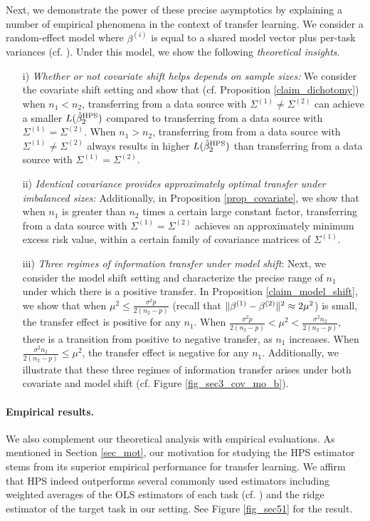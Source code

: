 Next, we demonstrate the power of these precise asymptotics by explaining a number of empirical phenomena in the context of transfer learning.
We consider a random-effect model where $\beta^{(i)}$ is equal to a shared model vector plus per-task variances (cf. \citet{dobriban2018high}).
Under this model, we show the following \textit{theoretical insights}.
\begin{enumerate}
    \item[i)] \textit{Whether or not covariate shift helps depends on sample sizes:} We consider the covariate shift setting and show that (cf. Proposition \ref{claim_dichotomy}) when $n_1 < n_2$, transferring from a data source with $\Sigma^{(1)} \neq \Sigma^{(2)}$ can achieve a smaller $L(\hat{\beta}_2^{\textup{HPS}})$ compared to transferring from a data source with $\Sigma^{(1)} = \Sigma^{(2)}$. When $n_1 > n_2$, transferring from from a data source with $\Sigma^{(1)} \neq \Sigma^{(2)}$ always results in higher $L(\hat{\beta}_2^{\textup{HPS}})$ than transferring from a data source with $\Sigma^{(1)} = \Sigma^{(2)}$.
    \item[ii)] \textit{Identical covariance provides approximately optimal transfer under imbalanced sizes:} Additionally, in Proposition \ref{prop_covariate}, we show that when $n_1$ is greater than $n_2$ times a certain large constant factor, transferring from a data source with $\Sigma^{(1)} = \Sigma^{(2)}$ achieves an approximately minimum excess risk value, within a certain family of covariance matrices of $\Sigma^{(1)}$.
    \item[iii)] \textit{Three regimes of information transfer under model shift}: Next, we consider the model shift setting and characterize the precise range of $n_1$ under which there is a positive transfer.
    In Proposition \ref{claim_model_shift}, we show that when $\mu^2 \le \frac{\sigma^2 p}{2(n_2 - p)}$ (recall that $\|\beta^{(1)} - \beta^{(2)}\|^2 \approx 2\mu^2$) is small, the transfer effect is positive for any $n_1$.
    When $\frac{\sigma^2 p}{2(n_2 - p)} < \mu^2 < \frac{\sigma^2 n_2}{2(n_2 - p)}$, there is a transition from positive to negative transfer, as $n_1$ increases.
    When $\frac{\sigma^2 n_2}{2(n_2 - p)} \le \mu^2$, the transfer effect is negative for any $n_1$.
    Additionally, we illustrate that these three regimes of information transfer arises under both covariate and model shift (cf. Figure \ref{fig_sec3_cov_mo_b}).
\end{enumerate}

\paragraph{Empirical results.}
We also complement our theoretical analysis with empirical evaluations.
As mentioned in Section \ref{sec_mot}, our motivation for studying the HPS estimator stems from its superior empirical performance for transfer learning.
We affirm that HPS indeed outperforms several commonly used estimators including weighted averages of the OLS estimators of each task (cf. \citet{bastani2020predicting}) and the ridge estimator of the target task in our setting. See Figure \ref{fig_sec51} for the result.

